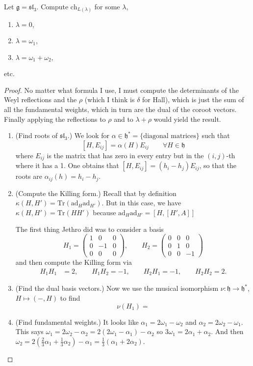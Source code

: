 \begin{exercise}
\label{exercise-weyl-chara-formu-sl3}
Let $\mathfrak{g}=\mathfrak{sl}_3$. Compute
$\text{ch}_{L(\lambda)}$
for some $\lambda$,
\begin{enumerate}
\item $\lambda=0$,
\item $\lambda=\omega_1$,
\item $\lambda=\omega_1+\omega_2$,
\end{enumerate}
etc.
\end{exercise}

\begin{proof}
No matter what formula I use, I must compute
the determinants of the Weyl reflections
and the $\rho$ (which I think is $\delta$ for
Hall),
which is just the sum of all the fundamental
weights,
which in turn are the dual of the coroot
vectors.
Finally applying the reflections to $\rho$
and
to $\lambda+\rho$ would yield the result.
\begin{enumerate}
\item (Find roots of $\mathfrak{sl}_3$.) We
look for $\alpha \in \mathfrak{h}^*
= \{\text{diagonal matrices}\}$ such that
$$
[H,E_{ij}]=\alpha(H)E_{ij}\qquad \forall H
\in \mathfrak{h}
$$
where $E_{ij}$ is the matrix that has zero in
every entry but
in the $(i,j)$-th where it has a 1. One
obtains that
$[H,E_{ij}]=(h_i-h_j)E_{ij}$, so that the
roots are
$\alpha_{ij}(h)=h_i-h_j$.

\item (Compute the Killing form.) Recall that
by definition
$\kappa(H,H')=\text{Tr}(\text{ad}_H\text{ad}
_{H'})$.
But in this case, we have
$\kappa(H,H')=\text{Tr}(HH')$
because
$\text{ad}_H\text{ad}_{H'}=[H,[H',A]]$

The first thing Jethro did was to consider a
basis
$$
H_1=\begin{pmatrix}
1&0&0\\
0&-1&0\\
0&0&0
\end{pmatrix},
\qquad
H_2=\begin{pmatrix}
0&0&0\\
0&1&0\\
0&0&-1
\end{pmatrix}
$$
and then compute the Killing form via
$$
\begin{aligned}
H_1H_1&=2,\qquad H_1H_2=-1,\qquad
H_2H_1=-1,\qquad H_2H_2=2.
\end{aligned}
$$

\item (Find the dual basis vectors.) Now we
use the musical
isomorphism $\nu:\mathfrak{h}\to
\mathfrak{h}^*$,
$H\mapsto (-,H)$ to find
$$
\nu(H_1)=
$$
\item (Find fundamental weights.) It looks
like $\alpha_1=2 \omega_1-\omega_2$
and $\alpha_2=2\omega_2-\omega_1$. This says
$\omega_1=2\omega_2-\alpha_2=2(2\omega_1-
\alpha_1)-\alpha_2$
so
$3\omega_1=2\alpha_1+\alpha_2$. And then
$\omega_2=2(\frac{2}{3}\alpha_1+\frac{1}{3}
\alpha_2)-\alpha_1
=\frac{1}{3}(\alpha_1+2\alpha_2)$.


\end{enumerate}
\end{proof}
